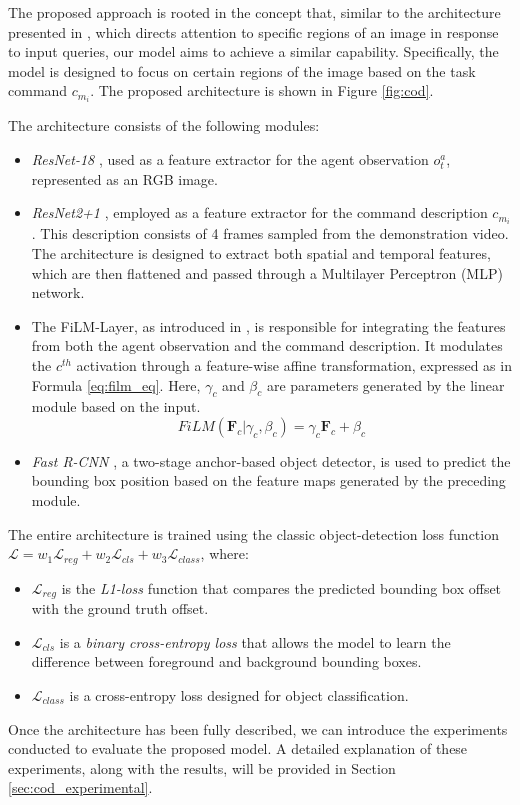 The proposed approach is rooted in the concept that, similar to the architecture presented in \cite{perez2018film}, which directs attention to specific regions of an image in response to input queries, our model aims to achieve a similar capability. Specifically, the model is designed to focus on certain regions of the image based on the task command $c_{m_{i}}$. The proposed architecture is shown in Figure \ref{fig:cod}.


The architecture consists of the following modules:
\begin{itemize}
    \item \textit{ResNet-18} \cite{resnet}, used as a feature extractor for the agent observation $o^{a}_{t}$, represented as an RGB image.
    \item \textit{ResNet2+1} \cite{resnet21}, employed as a feature extractor for the command description $c_{m_{i}}$. This description consists of 4 frames sampled from the demonstration video. The architecture is designed to extract both spatial and temporal features, which are then flattened and passed through a Multilayer Perceptron (MLP) network.
    \item The FiLM-Layer, as introduced in \cite{perez2018film}, is responsible for integrating the features from both the agent observation and the command description. It modulates the $c^{th}$ activation through a feature-wise affine transformation, expressed as in Formula \ref{eq:film_eq}. Here, $\gamma_{c}$ and $\beta_{c}$ are parameters generated by the linear module based on the input.
    \begin{equation}
        \label{eq:film_eq}
        FiLM(\textbf{F}_{c}|\gamma_{c}, \beta_{c}) = \gamma_{c} \textbf{F}_{c} + \beta_{c}
    \end{equation}
    \item \textit{Fast R-CNN} \cite{fastrcnn}, a two-stage anchor-based object detector, is used to predict the bounding box position based on the feature maps generated by the preceding module.
\end{itemize}

The entire architecture is trained using the classic object-detection loss function $\mathcal{L} = w_{1}\mathcal{L}_{reg} + w_{2}\mathcal{L}_{cls} + w_{3}\mathcal{L}_{class}$, where:
\begin{itemize}
    \item $\mathcal{L}_{reg}$ is the \textit{L1-loss} function that compares the predicted bounding box offset with the ground truth offset.
    \item $\mathcal{L}_{cls}$ is a \textit{binary cross-entropy loss} that allows the model to learn the difference between foreground and background bounding boxes.
    \item $\mathcal{L}_{class}$ is a cross-entropy loss designed for object classification.
\end{itemize}

Once the architecture has been fully described, we can introduce the experiments conducted to evaluate the proposed model. A detailed explanation of these experiments, along with the results, will be provided in Section \ref{sec:cod_experimental}.
